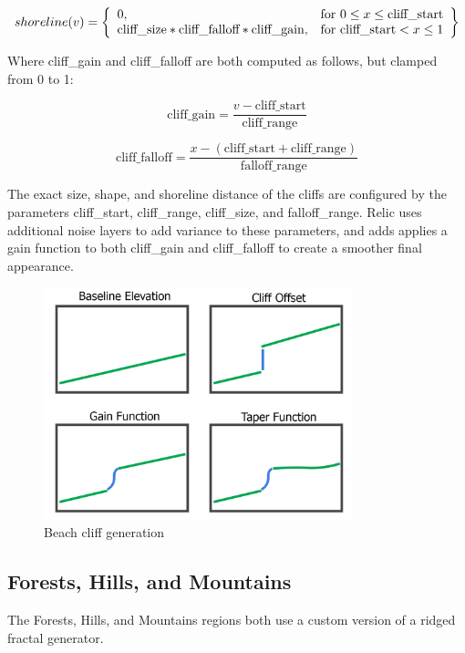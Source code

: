 $$
shoreline(v) = \left\{\begin{array}{lr}
	0, & \text{for } 0 \leq x \leq \text{cliff\_start} \\
	\text{cliff\textunderscore size} * \text{cliff\_falloff} * \text{cliff\_gain}, & \text{for } \text{cliff\_start} < x \leq 1
\end{array}\right\}
$$

Where cliff\_gain and cliff\_falloff are both computed as follows, but clamped from 0 to 1:

$$
\text{cliff\_gain} = \frac{v - \text{cliff\_start}}{\text{cliff\_range}}
$$

$$
\text{cliff\_falloff} = \frac{x - (\text{cliff\_start} + \text{cliff\_range})}{\text{falloff\_range}}
$$

The exact size, shape, and shoreline distance of the cliffs are configured by the parameters cliff\_start, cliff\_range, cliff\_size, and falloff\_range.
Relic uses additional noise layers to add variance to these parameters, and adds applies a gain function to both cliff\_gain and cliff\_falloff to create a smoother final appearance.

\begin{figure}
	\centering
		\includegraphics[width=0.8\textwidth]{figures/beachcliffs4x4}
	\caption{Beach cliff generation}
	\label{fig:beach_cliffs}
\end{figure}

\subsection{Forests, Hills, and Mountains} \label{sec:mountains}

The Forests, Hills, and Mountains regions both use a custom version of a ridged fractal generator.

